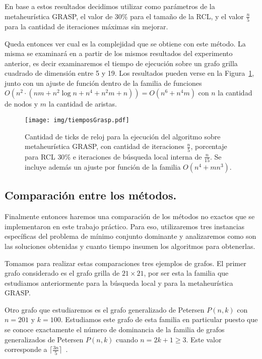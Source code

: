 En base a estos resultados decidimos utilizar como par\'ametros de la
metaheur\'istica GRASP, el valor de $30 \%$ para el tama\~no de la RCL,
y el valor $\frac{n}{5}$ para la cantidad de iteraciones m\'aximas sin
mejorar.

Queda entonces ver cual es la complejidad que se obtiene con este 
m\'etodo. La misma se examinar\'a en a partir de los mismos resultados 
del experimento anterior, es decir examinaremos el tiempo de ejecuci\'on
sobre un grafo grilla cuadrado de dimensi\'on entre 5 y 19. Los 
resultados pueden verse en la Figura~\ref{fig::tiempoGrasp}, junto con
un ajuste de funci\'on dentro de la familia de funciones 
$O(n^2 \cdot (nm + n^2 \log n + n^4 + n^2 m + n ) ) = O(n^6 + n^4 m)$ 
con $n$ la cantidad de nodos y $m$ la cantidad de aristas.

\begin{figure}[H]
	\caption{Cantidad de ticks de reloj para la ejecuci\'on del 
	algoritmo sobre metaheur\'istica GRASP, con cantidad de iteraciones
	$\frac{n}{5}$, porcentaje para RCL $30 \%$ e iteraciones de 
	b\'usqueda local interna de $\frac{n}{15}$. Se incluye adem\'as un ajuste
	por funci\'on de la familia $O(n^4 + m n^3)$.}
	\label{fig::tiempoGrasp}
	\centering
	\texttt{[image: img/tiemposGrasp.pdf]}
\end{figure}

\subsection{Comparaci\'on entre los m\'etodos.}

Finalmente entonces haremos una comparaci\'on de los m\'etodos no 
exactos que se implementaron en este trabajo pr\'actico. Para eso, 
utilizaremos tres instancias espec\'ificas del problema de m\'inimo 
conjunto dominante y analizaremos como son las soluciones obtenidas y
cuanto tiempo insumen los algoritmos para obtenerlas.

Tomamos para realizar estas comparaciones tres ejemplos de grafos. El
primer grafo considerado es el grafo grilla de $21 \times 21$, por ser
esta la familia que estudiamos anteriormente para la b\'usqueda local y
para la metaheur\'istica GRASP.

Otro grafo que estudiaremos es el grafo generalizado de Petersen 
$P(n,k)$ con $n = 201$ y $k = 100$. Estudiamos este grafo de esta 
familia en particular puesto que se conoce exactamente
el n\'umero de dominancia de la familia de grafos generalizados de
Petersen $P(n,k)$ cuando $n = 2k+1 \geq 3$. Este valor corresponde
a $\lceil \frac{3n}{5} \rceil$~\cite{genpetersen}.

